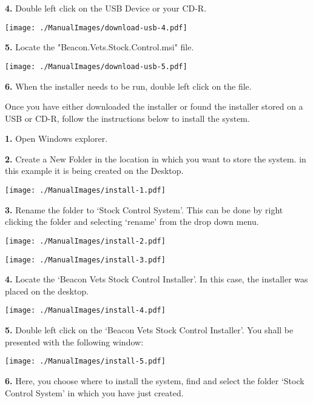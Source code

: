 \vspace{5mm}
\textbf{4.} Double left click on the USB Device or your CD-R.

\texttt{[image: ./ManualImages/download-usb-4.pdf]}

\vspace{5mm}
\textbf{5.} Locate the "Beacon.Vets.Stock.Control.msi" file.

\texttt{[image: ./ManualImages/download-usb-5.pdf]}

\vspace{5mm}
\textbf{6.} When the installer needs to be run, double left click on the file.


\vspace{5mm}

Once you have either downloaded the installer or found the installer stored on a USB or CD-R, follow the instructions below to install the system.

\textbf{1.} Open Windows explorer.

\textbf{2.} Create a New Folder in the location in which you want to store the system. in this example it is being created on the Desktop.

\texttt{[image: ./ManualImages/install-1.pdf]}

\pagebreak

\textbf{3.} Rename the folder to `Stock Control System'. This can be done by right clicking the folder and selecting `rename' from the drop down menu.

\texttt{[image: ./ManualImages/install-2.pdf]}

\texttt{[image: ./ManualImages/install-3.pdf]}

\pagebreak

\textbf{4.} Locate the `Beacon Vets Stock Control Installer'. In this case, the installer was placed on the desktop.

\texttt{[image: ./ManualImages/install-4.pdf]}

\pagebreak

\textbf{5.} Double left click on the `Beacon Vets Stock Control Installer'. You shall be presented with the following window:

\texttt{[image: ./ManualImages/install-5.pdf]}

\pagebreak

\textbf{6.} Here, you choose where to install the system, find and select the folder `Stock Control System' in which you have just created.

